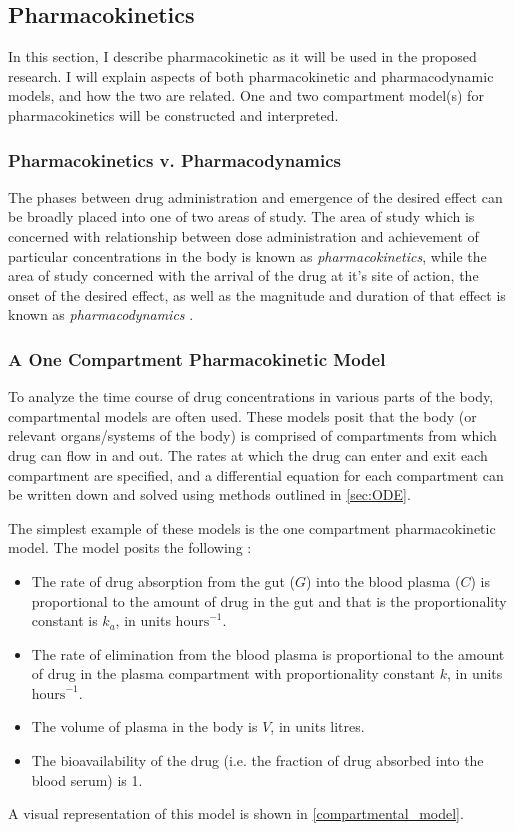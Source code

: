 \subsection{Pharmacokinetics}

In this section, I describe pharmacokinetic as it will be used in the proposed research.  I will explain aspects of both pharmacokinetic and pharmacodynamic models, and how the two are related.  One and two compartment model(s) for pharmacokinetics will be constructed and interpreted.


\subsubsection{Pharmacokinetics v. Pharmacodynamics}

The phases between drug administration and emergence of the desired effect can be broadly placed into one of two areas of study.  The area of study which is concerned with relationship between dose administration and achievement of particular concentrations in the body is known as \textit{pharmacokinetics}, while the area of study concerned with the arrival of the drug at it's site of action, the onset of the desired effect, as well as the magnitude and duration of that effect is known as  \textit{pharmacodynamics} \cite{rosenbaum2016basic}.  

\subsubsection{A One Compartment Pharmacokinetic Model}

To analyze the time course of drug concentrations in various parts of the body, compartmental models are often used.  These models posit that the body (or relevant organs/systems of the body) is comprised of compartments from which drug can flow in and out. The rates at which the drug can enter and exit each compartment are specified, and a differential equation for each compartment can be written down and solved using methods outlined in \cref{sec:ODE}.

The simplest example of these models is the one compartment pharmacokinetic model.  The model posits the following \cite{wakefield1992bayesian}:  
%
\begin{itemize}
\item The rate of drug absorption from the gut ($ G  $) into the blood plasma ($ C $) is proportional to the amount of drug in the gut and that is the proportionality constant is $ k_a $, in units $ \text{hours}^{-1} $.  

\item The rate of elimination from the blood plasma is proportional to the amount of drug in the plasma compartment with proportionality constant $ k $, in units $ \text{hours}^{-1} $.

\item The volume of plasma in the body is $ V $, in units litres.

\item The bioavailability of the drug (i.e. the fraction of drug absorbed into the blood serum) is 1.
\end{itemize}
%
 A visual representation of this model is shown in \cref{compartmental_model}.

